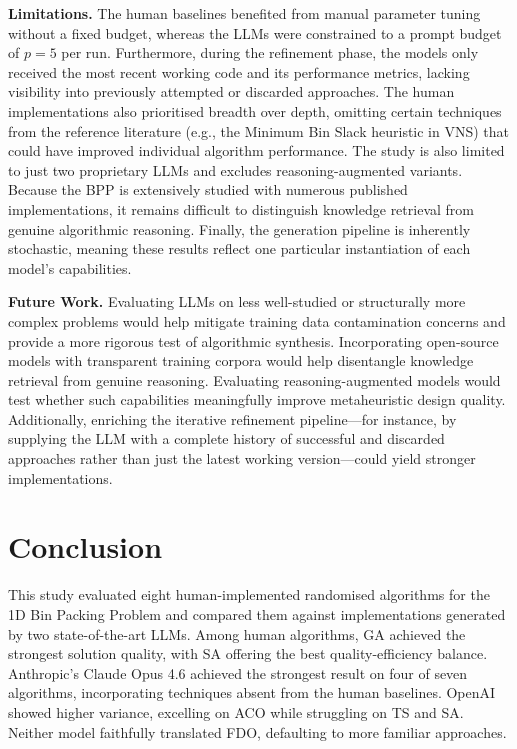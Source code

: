 \documentclass[11pt]{article}
\begin{document}
\textbf{Limitations.} The human baselines benefited from manual parameter tuning without a fixed budget, whereas the LLMs were constrained to a prompt budget of $p=5$ per run. Furthermore, during the refinement phase, the models only received the most recent working code and its performance metrics, lacking visibility into previously attempted or discarded approaches. The human implementations also prioritised breadth over depth, omitting certain techniques from the reference literature (e.g., the Minimum Bin Slack heuristic in VNS) that could have improved individual algorithm performance. The study is also limited to just two proprietary LLMs and excludes reasoning-augmented variants. Because the BPP is extensively studied with numerous published implementations, it remains difficult to distinguish knowledge retrieval from genuine algorithmic reasoning. Finally, the generation pipeline is inherently stochastic, meaning these results reflect one particular instantiation of each model's capabilities.

\textbf{Future Work.} Evaluating LLMs on less well-studied or structurally more complex problems would help mitigate training data contamination concerns and provide a more rigorous test of algorithmic synthesis. Incorporating open-source models with transparent training corpora would help disentangle knowledge retrieval from genuine reasoning. Evaluating reasoning-augmented models would test whether such capabilities meaningfully improve metaheuristic design quality. Additionally, enriching the iterative refinement pipeline---for instance, by supplying the LLM with a complete history of successful and discarded approaches rather than just the latest working version---could yield stronger implementations.

\section{Conclusion}

This study evaluated eight human-implemented randomised algorithms for the 1D Bin Packing Problem and compared them against implementations generated by two state-of-the-art LLMs. Among human algorithms, GA achieved the strongest solution quality, with SA offering the best quality-efficiency balance. Anthropic's Claude Opus 4.6 achieved the strongest result on four of seven algorithms, incorporating techniques absent from the human baselines. OpenAI showed higher variance, excelling on ACO while struggling on TS and SA. Neither model faithfully translated FDO, defaulting to more familiar approaches.
\end{document}
